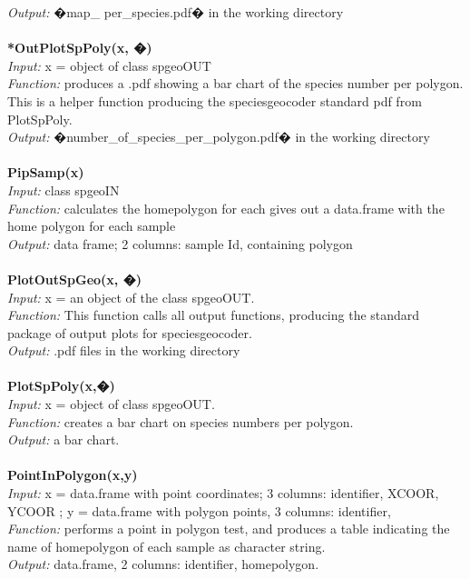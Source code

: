 \documentclass[a4paper,titlepage,11pt]{scrreprt}
\begin{document}
\textit{Output:} �map\_ per\_species.pdf� in the working directory\\
\\
\textbf{*OutPlotSpPoly(x, �)}\\
\textit{Input:} x = object of class spgeoOUT\\
\textit{Function:} produces a .pdf showing a bar chart of the species number per polygon. This is a helper function producing the speciesgeocoder standard pdf from PlotSpPoly.\\
\textit{Output:} �number\_of\_species\_per\_polygon.pdf� in the working directory\\
\\
\textbf{PipSamp(x)}\\
\textit{Input:} class spgeoIN\\
\textit{Function:} calculates the homepolygon for each gives out a data.frame with the home polygon for each sample\\
\textit{Output:} data frame; 2 columns: sample Id, containing polygon \\
\\
\textbf{PlotOutSpGeo(x, �)}\\
\textit{Input:} x = an object of the class spgeoOUT.\\
\textit{Function:} This function calls all output functions, producing the standard package of output plots for speciesgeocoder.\\
\textit{Output:} .pdf files in the working directory\\
\\
\textbf{PlotSpPoly(x,�)}\\
\textit{Input:} x = object of class spgeoOUT.\\
\textit{Function:} creates a bar chart on species numbers per polygon.\\
\textit{Output:} a bar chart.\\
\\
\textbf{PointInPolygon(x,y)}\\
\textit{Input:} x = data.frame with point coordinates; 3 columns: identifier, XCOOR, YCOOR ; y = data.frame with polygon points, 3 columns: identifier, \\ 
\textit{Function:} performs a point in polygon test, and produces a table indicating the name of homepolygon of each sample as character string.\\
\textit{Output:} data.frame, 2 columns: identifier, homepolygon.\\
\\
\end{document}
